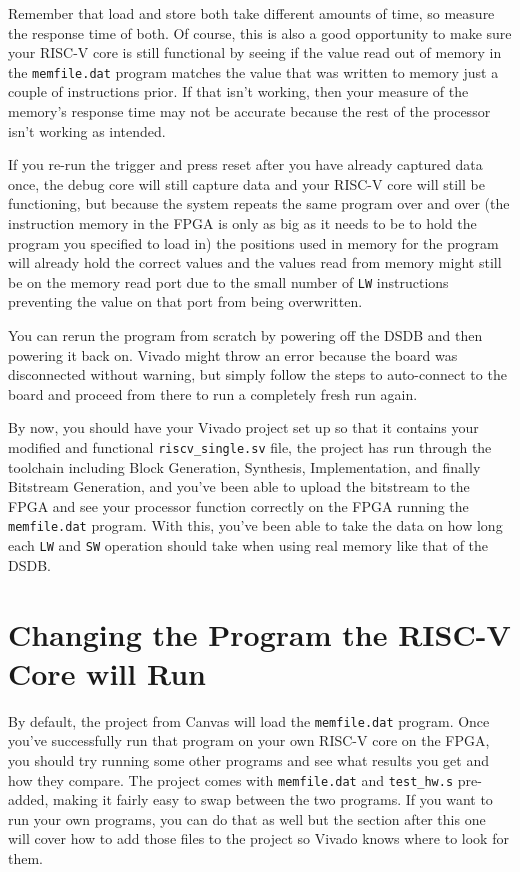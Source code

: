 \documentclass{article}
\begin{document}
\begin{enumerate}
Remember that load and store both take
different amounts of time, so measure the response time of both.  Of course,
this is also a good opportunity to make sure your RISC-V core is still functional
by seeing if the value read out of memory in the \verb|memfile.dat| program
matches the value that was written to memory just a couple of instructions
prior.  If that isn't working, then your measure of the memory's response time
may not be accurate because the rest of the processor isn't working as intended.

If you re-run the trigger and press reset after you have already captured data
once, the debug core will still capture data and your RISC-V core will still be
functioning, but because the system repeats the same program over and over (the
instruction memory in the FPGA is only as big as it needs to be to hold the
program you specified to load in) the positions used in memory for the program
will already hold the correct values and the values read from memory might still
be on the memory read port due to the small number of \verb|LW| instructions
preventing the value on that port from being overwritten.

You can rerun the program from scratch by powering off the DSDB and then
powering it back on.  Vivado might throw an error because the board was
disconnected without warning, but simply follow the steps to auto-connect to the
board and proceed from there to run a completely fresh run again.
\end{enumerate}

By now, you should have your Vivado project set up so that it contains your
modified and functional \verb|riscv_single.sv| file, the project has run through
the toolchain including Block Generation, Synthesis, Implementation, and finally
Bitstream Generation, and you've been able to upload the bitstream to the FPGA
and see your processor function correctly on the FPGA running the
\verb|memfile.dat| program.  With this, you've been able to take the data on how
long each \verb|LW| and \verb|SW| operation should take when using real memory
like that of the DSDB.

\section{Changing the Program the RISC-V Core will Run}

By default, the project from Canvas will load the \verb|memfile.dat| program.
Once you've successfully run that program on your own RISC-V core on the FPGA, you
should try running some other programs and see what results you get and how they
compare.  The project comes with \verb|memfile.dat| and \verb|test_hw.s| 
pre-added, making it fairly easy to swap between the two programs.  If you want
to run your own programs, you can do that as well but the section after this one
will cover how to add those files to the project so Vivado knows where to look
for them.
\end{document}
